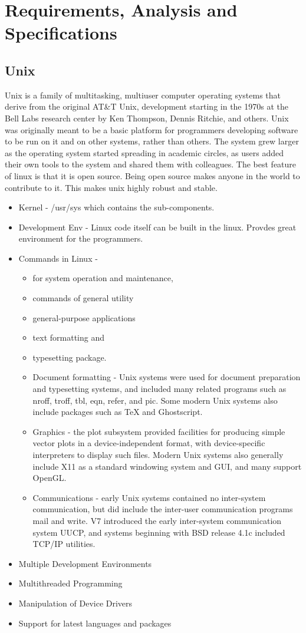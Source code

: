 \chapter{Requirements, Analysis and Specifications}
\section{Unix}
Unix is a family of multitasking, multiuser computer operating systems that derive from the original AT\&T Unix, development starting in the 1970s at the Bell Labs research center by Ken Thompson, Dennis Ritchie, and others.
Unix was originally meant to be a basic platform for programmers developing software to be run on it and on other systems, rather than others. The system grew larger as the operating system started spreading in academic circles, as users added their own tools to the system and shared them with colleagues. The best feature of linux is that it is open source. Being open source makes anyone in the world to contribute to it. This makes unix highly robust and stable.  
\begin{itemize}
	\item Kernel - /usr/sys which contains the sub-components.
	\item Development Env - Linux code itself can be built in the linux. Provdes great environment for the programmers.
	\item Commands in Linux - \begin{itemize}
	\item  for system operation and maintenance, \item commands of general utility\item general-purpose applications  \item text formatting and \item typesetting package. 
	\item Document formatting - Unix systems were used  for document preparation and typesetting systems, and included many related programs such as nroff, troff, tbl, eqn, refer, and pic. Some modern Unix systems also include packages such as TeX and Ghostscript.
	\item Graphics - the plot subsystem provided facilities for producing simple vector plots in a device-independent format, with device-specific interpreters to display such files. Modern Unix systems also generally include X11 as a standard windowing system and GUI, and many support OpenGL.
	\item Communications - early Unix systems contained no inter-system communication, but did include the inter-user communication programs mail and write. V7 introduced the early inter-system communication system UUCP, and systems beginning with BSD release 4.1c included TCP/IP utilities.
\end{itemize}
\item Multiple Development Environments
\item Multithreaded Programming
\item Manipulation of Device Drivers
\item Support for latest languages and packages
\end{itemize}
